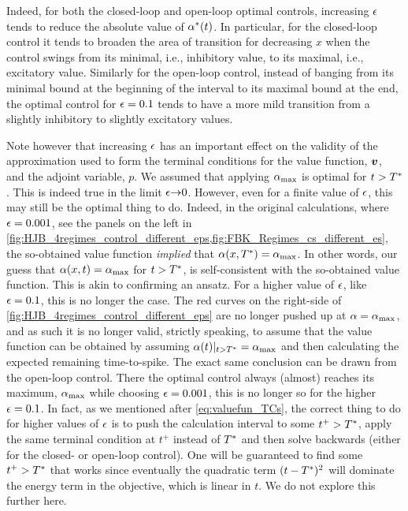 Indeed, for both the closed-loop and open-loop optimal controls, increasing
${\epsilon}$ tends to reduce the absolute value of $\alpha^*(t)$. In particular, for the
closed-loop control it tends to broaden the area of transition for decreasing
$x$ when the control swings from its minimal, i.e., inhibitory value, to its
maximal, i.e., excitatory value. Similarly for the open-loop control, instead of
banging from its minimal bound at the beginning of the interval to its maximal
bound at the end, the optimal control for ${\epsilon} = 0.1$ tends to have a more mild
transition from a slightly inhibitory to slightly excitatory values.
  
Note however that increasing ${\epsilon}$ has an important effect on the validity of
the approximation used to form the terminal conditions for the value function,
${ \boldsymbol{v} }$, and the adjoint variable, $p$. We assumed that applying ${ \alpha_{\textrm{max}} }$ is optimal
for $t>{ T^* }$. This is indeed true in the limit ${\epsilon} {\rightarrow} 0$. However, even for a
finite value of ${\epsilon}$, this may still be the optimal thing to do. Indeed, in
the original calculations, where ${\epsilon}=0.001$, see the panels on the left in
\cref{fig:HJB_4regimes_control_different_eps,fig:FBK_Regimes_cs_different_es},
the so-obtained value function {\sl implied} that $\alpha(x,{ T^* }) = { \alpha_{\textrm{max}} }$. In other
words, our guess that $\alpha(x, t) = { \alpha_{\textrm{max}} }$ for $t > { T^* }$, is self-consistent with
the so-obtained value function. This is akin to confirming an ansatz. For a
higher value of ${\epsilon}$, like ${\epsilon} = 0.1$, this is no longer the case. The red
curves on the right-side of \cref{fig:HJB_4regimes_control_different_eps} are no
longer pushed up at $\alpha = { \alpha_{\textrm{max}} }$, and as such it is no longer valid, strictly
speaking, to assume that the value function can be obtained by assuming
$\alpha(t)|_{t>{ T^* }} = { \alpha_{\textrm{max}} }$ and then calculating the expected remaining
time-to-spike. The exact same conclusion can be drawn from the open-loop
control. There the optimal control always (almost) reaches its maximum, ${ \alpha_{\textrm{max}} }$
while choosing ${\epsilon} = 0.001$, this is no longer so for the higher ${\epsilon} = 0.1$.
In fact, as we mentioned after \cref{eq:valuefun_TCs}, the correct thing to do
for higher values of ${\epsilon}$ is to push the calculation interval to some $t^+ >
{ T^* }$, apply the same terminal condition at $t^+$ instead of ${ T^* }$ and then solve
backwards (either for the closed- or open-loop control). One will be guaranteed
to find some $t^+ > { T^* }$ that works since eventually the quadratic term
$(t-{ T^* })^2$ will dominate the energy term in the objective, which is linear in
$t$. We do not explore this further here.
